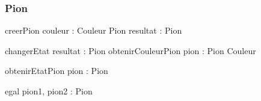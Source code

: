\subsubsection{Pion}
\begin{algorithme}

\fonction
{creerPion}
{couleur : Couleur}
{Pion}
{resultat : Pion}
{
}

\procedure
{changerEtat}
{}
{resultat : Pion}
{
{
}
{
}
}
\fonction
{obtenirCouleurPion}
{pion : Pion}
{Couleur}
{}
{}

\fonction
{obtenirEtatPion}
{pion : Pion}
{\naturel}
{}
{}

\fonction
{egal}
{pion1, pion2 : Pion}
{\booleen}
{}
{}
\end{algorithme}

